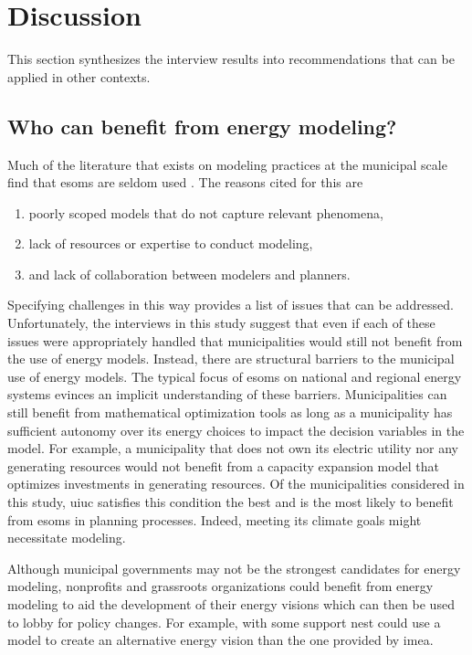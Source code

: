 \section{Discussion}
This section synthesizes the interview results into recommendations that can be
applied in other contexts.

\subsection{Who can benefit from energy modeling?}
Much of the literature that exists on modeling practices at the municipal scale
find that \acp{esom} are seldom used
\cite{ben_amer_too_2020,johannsen_municipal_2023}. The reasons cited for this
are \cite{ben_amer_too_2020,johannsen_municipal_2023,susser_better_2022}
\begin{enumerate}
    \item poorly scoped models that do not capture relevant phenomena,
    \item lack of resources or expertise to conduct modeling, 
    \item and lack of collaboration between modelers and planners.
\end{enumerate} 
Specifying challenges in this way provides a list of issues that can be
addressed. Unfortunately, the interviews in this study suggest that even if each
of these issues were appropriately handled that municipalities would still not
benefit from the use of energy models. Instead, there are structural barriers to
the municipal use of energy models. The typical focus of \acp{esom} on national
and regional energy systems evinces an implicit understanding of these barriers.
Municipalities can still benefit from mathematical optimization tools as long as
a municipality has sufficient autonomy over its energy choices to impact the
decision variables in the model. For example, a municipality that does not own
its electric utility nor any generating resources would not benefit from a
capacity expansion model that optimizes investments in generating resources. Of
the municipalities considered in this study, \ac{uiuc} satisfies this condition
the best and is the most likely to benefit from \acp{esom} in planning
processes. Indeed, meeting its climate goals might necessitate modeling.

Although municipal governments may not be the strongest candidates for energy
modeling, nonprofits and grassroots organizations could benefit from energy
modeling to aid the development of their energy visions which can then be used
to lobby for policy changes. For example, with some support \ac{nest} could use
a model to create an alternative energy vision than the one provided by
\ac{imea}.

